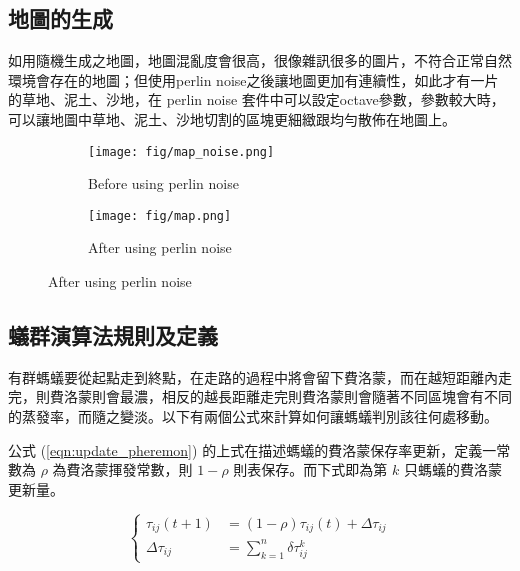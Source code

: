 \documentclass[sigconf]{acmart}
\begin{document}
\subsection{地圖的生成}

	如用隨機生成之地圖，地圖混亂度會很高，很像雜訊很多的圖片，不符合正常自然環境會存在的地圖；但使用perlin noise之後讓地圖更加有連續性，如此才有一片的草地、泥土、沙地，在 perlin noise 套件中可以設定octave參數，參數較大時，可以讓地圖中草地、泥土、沙地切割的區塊更細緻跟均勻散佈在地圖上。

\begin{figure}[htb]
  \centering
  \begin{subfigure}{0.2\textwidth}
    \centering
    \texttt{[image: fig/map\_noise.png]} %
    \caption{Before using perlin noise}
    \label{fig:sub1}
  \end{subfigure}
  \hfill
  \begin{subfigure}{0.2\textwidth}
    \centering
    \texttt{[image: fig/map.png]} %
    \caption{After using perlin noise}
    \label{fig:sub2}
  \end{subfigure}
\end{figure}



	
\subsection{蟻群演算法規則及定義}

	有群螞蟻要從起點走到終點，在走路的過程中將會留下費洛蒙，而在越短距離內走完，則費洛蒙則會最濃，相反的越長距離走完則費洛蒙則會隨著不同區塊會有不同的蒸發率，而隨之變淡。以下有兩個公式來計算如何讓螞蟻判別該往何處移動。


	公式 (\ref{eqn:update_pheremon}) 的上式在描述螞蟻的費洛蒙保存率更新，定義一常數為 $\rho$ 為費洛蒙揮發常數，則 $1- \rho$ 則表保存。而下式即為第 $k$ 只螞蟻的費洛蒙更新量。

\begin{equation}
  \label{eqn:update_pheremon}
\left\{\begin{array}{ll}
                 \tau_{ij}(t + 1) &= (1 - \rho)\tau_{ij}(t) + \Delta\tau_{ij} \\
                 \Delta\tau_{ij} &= \sum_{k=1}^{n} \delta\tau_{ij}^{k}
                \end{array} \right.
\end{equation}
\end{document}
